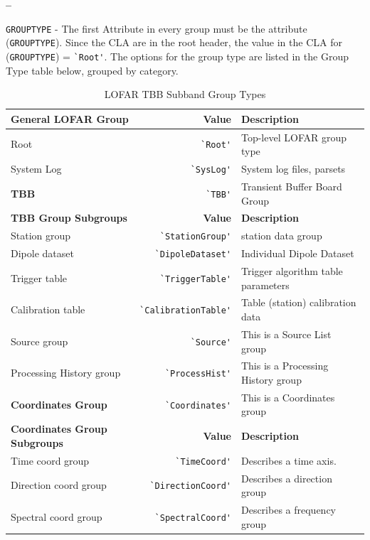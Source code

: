 \documentclass[a4paper,10pt,bibtotoc]{scrartcl}
\begin{document}
\begin{list}{\textbf{--}}{}
\item  \verb|GROUPTYPE| - The first Attribute in every group must be the attribute (\verb|GROUPTYPE|).  Since the CLA are in the root header, the value in the CLA for (\verb|GROUPTYPE|) = \verb|`Root'|.  The options for the group type are listed in the Group Type table below, grouped by category.
\begin{table}[htb]
  \centering
  \begin{tabular}{|lrp{6cm}|} 
    \hline
    \sc \textbf{General LOFAR Group} & \sc \textbf{Value} & \textbf{Description} \\
    \hline
    Root          & \verb|`Root'|    & Top-level LOFAR group type \\
    System Log    & \verb|`SysLog'|  & System log files, parsets \\
   \textbf{TBB} & \verb|`TBB'| & Transient Buffer Board Group \\
    \hline \hline
   \sc \textbf{TBB Group Subgroups} & \textbf{Value} & \textbf{Description} \\
   \hline
   Station group & \verb|`StationGroup'| & station data group \\
   Dipole dataset & \verb|`DipoleDataset'| & Individual Dipole Dataset \\
   Trigger table & \verb|`TriggerTable'| &  Trigger algorithm table parameters \\
   Calibration table & \verb|`CalibrationTable'| & Table (station) calibration data \\
   Source group & \verb|`Source'| & This is a Source List group \\
   Processing History group &\verb|`ProcessHist'| & This is a Processing History group \\
   \textbf{Coordinates Group} & \verb|`Coordinates'| & This is a Coordinates group \\
    \hline
    \sc \textbf{Coordinates Group Subgroups} & \textbf{Value} & \textbf{Description} \\
    \hline
    Time coord group		&\verb|`TimeCoord'|		& Describes a time axis. \\
    Direction coord group	&\verb|`DirectionCoord'|	& Describes a direction group \\
    Spectral coord group	&\verb|`SpectralCoord'|		& Describes a frequency group \\
    \hline
   \end{tabular}
  \label{tab:grouptype}
  \caption{LOFAR TBB Subband Group Types}
\end{table}
\end{list}
\end{document}
